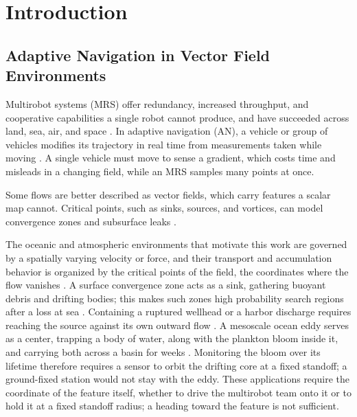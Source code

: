 \chapter{Introduction}
\label{ch:intro}

\section{Adaptive Navigation in Vector Field Environments}
\label{sec:ch1:an}

Multirobot systems (MRS) offer redundancy, increased
throughput, and cooperative capabilities a single robot cannot produce, and have
succeeded across land, sea, air, and space \cite{1,2}. In adaptive
navigation (AN), a vehicle or group of vehicles modifies its trajectory in
real time from measurements taken while moving \cite{3}. A single vehicle
must move to sense a gradient, which costs time and misleads in a changing
field, while an MRS samples many points at once.

Some flows are better described as vector fields, which carry features a
scalar map cannot. Critical points, such as sinks, sources, and vortices,
can model convergence zones \cite{4} and subsurface leaks \cite{5}.

The oceanic and atmospheric environments that motivate this work are governed by a spatially varying velocity or force, and their transport and accumulation behavior is organized by the critical points of the field, the coordinates where the flow vanishes \cite{6,7}. A surface convergence zone acts as a sink, gathering buoyant debris and drifting bodies; this makes such zones high probability search regions after a loss at sea \cite{8,9}. Containing a ruptured wellhead or a harbor discharge requires reaching the source against its own outward flow \cite{5,10}. A mesoscale ocean eddy serves as a center, trapping a body of water, along with the plankton bloom inside it, and carrying both across a basin for weeks \cite{11,12,13}. Monitoring the bloom over its lifetime therefore requires a sensor to orbit the drifting core at a fixed standoff; a ground-fixed station would not stay with the eddy. These applications require the coordinate of the feature itself, whether to drive the multirobot team onto it or to hold it at a fixed standoff radius; a heading toward the feature is not sufficient.

